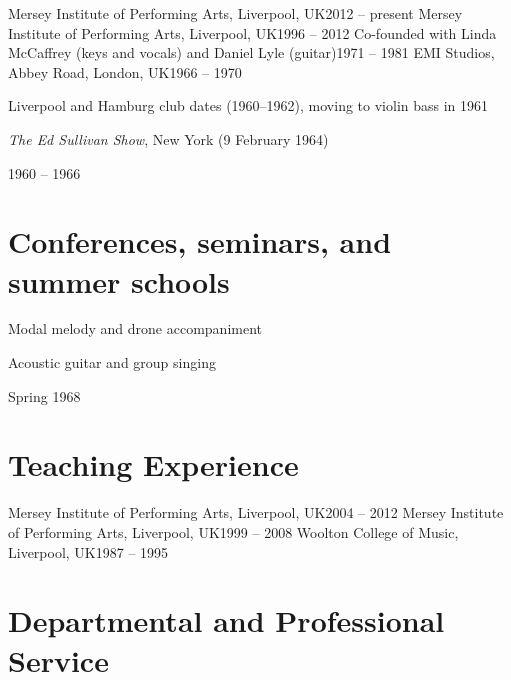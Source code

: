 \documentclass[11pt,a4paper]{article}
\begin{document}
  {Mersey Institute of Performing Arts, Liverpool, UK}{2012 -- present}{}
  {Mersey Institute of Performing Arts, Liverpool, UK}{1996 -- 2012}{}
  {Co-founded with Linda McCaffrey (keys and vocals) and Daniel Lyle (guitar)}{1971 -- 1981}{}
  {EMI Studios, Abbey Road, London, UK}{1966 -- 1970}{}
  {Liverpool and Hamburg club dates (1960--1962), moving to violin bass in 1961\par
   \cvbullet{} \emph{The Ed Sullivan Show}, New York (9 February 1964)}
  {1960 -- 1966}{}

\section{Conferences, seminars, and summer schools}


  {\footnotesize
   \cvbullet{} Modal melody and drone accompaniment\par
   \cvbullet{} Acoustic guitar and group singing}
  {Spring 1968}{}

\section{Teaching Experience}

  {Mersey Institute of Performing Arts, Liverpool, UK}{2004 -- 2012}{}
  {Mersey Institute of Performing Arts, Liverpool, UK}{1999 -- 2008}{}
  {Woolton College of Music, Liverpool, UK}{1987 -- 1995}{}

\section{Departmental and Professional Service}

\end{document}
